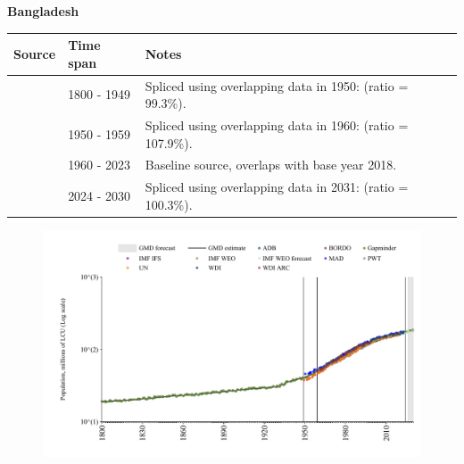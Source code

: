 \documentclass[12pt,a4paper,landscape]{article}
\begin{document}
\begin{adjustbox}{max totalsize={\paperwidth}{\paperheight},center}
\begin{minipage}[t][\textheight][t]{\textwidth}
\vspace*{0.5cm}
{}
\begin{center}
{\Large\bfseries Bangladesh}
\end{center}
\vspace{0.5cm}
\begin{table}[H]
\centering
\small
\begin{tabular}{|l|l|l|}
\hline
\textbf{Source} & \textbf{Time span} & \textbf{Notes} \\
\hline
\rowcolor{white}\cite{Gapminder}& 1800 - 1949 &Spliced using overlapping data in 1950: (ratio = 99.3\%).\\
\rowcolor{lightgray}\cite{IMF_IFS}& 1950 - 1959 &Spliced using overlapping data in 1960: (ratio = 107.9\%).\\
\rowcolor{white}\cite{WDI}& 1960 - 2023 &Baseline source, overlaps with base year 2018.\\
\rowcolor{lightgray}\cite{Gapminder}& 2024 - 2030 &Spliced using overlapping data in 2031: (ratio = 100.3\%).\\
\hline
\end{tabular}
\end{table}
\begin{figure}[H]
\centering
\includegraphics[width=\textwidth,height=0.6\textheight,keepaspectratio]{graphs/BGD_pop.pdf}
\end{figure}
\end{minipage}
\end{adjustbox}
\end{document}
